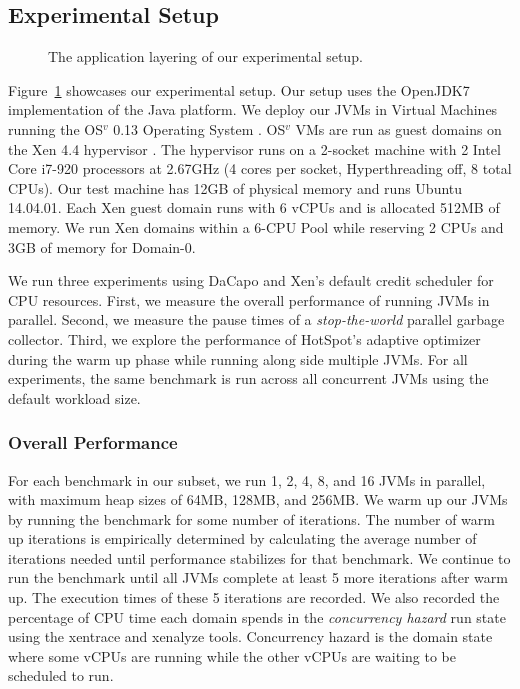 \documentclass{sig-alternate}
\begin{document}
\subsection{Experimental Setup}\label{subsec:expsetup}
\begin{figure}
\centering
{}
\caption{The application layering of our experimental setup.}
\label{fig:dacaposetup}
\end{figure}

Figure~\ref{fig:dacaposetup} showcases our experimental setup. Our setup uses the OpenJDK7 implementation of the Java platform. We deploy our JVMs in Virtual Machines running the OS$^{v}$ 0.13 Operating System \cite{aviOSv2014}. OS$^{v}$ VMs are run as guest domains on the Xen 4.4 hypervisor \cite{barham2003xen}. The hypervisor runs on a 2-socket machine with 2 Intel Core i7-920 processors at 2.67GHz (4 cores per socket, Hyperthreading off,  8 total CPUs).  Our test machine has 12GB of physical memory and runs Ubuntu 14.04.01. Each Xen guest domain runs with 6 vCPUs and is allocated 512MB of memory. We run Xen domains within a 6-CPU Pool while reserving 2 CPUs and 3GB of memory for Domain-0.  

We run three experiments using DaCapo and Xen's default credit scheduler for CPU resources. First, we measure the overall performance of running JVMs in parallel. Second, we measure the pause times of a \textit{stop-the-world} parallel garbage collector. Third, we explore the performance of HotSpot's adaptive optimizer during the warm up phase while running along side multiple JVMs. For all experiments, the same benchmark is run across all concurrent JVMs using the default workload size.

\subsubsection{Overall Performance} \label{sssec:overallperf}
For each benchmark in our subset, we run 1, 2, 4, 8, and 16 JVMs in parallel, with maximum heap sizes of 64MB, 128MB, and 256MB. We warm up our JVMs by running the benchmark for some number of iterations. The number of warm up iterations is empirically determined by calculating the average number of iterations needed until performance stabilizes for that benchmark. We continue to run the benchmark until all JVMs complete at least 5 more iterations after warm up.  The execution times of these 5 iterations are recorded. We also recorded the percentage of CPU time each domain spends in the \textit{concurrency hazard} run state using the xentrace and xenalyze tools. Concurrency hazard is the domain state where some vCPUs are running while the other vCPUs are waiting to be scheduled to run. 
\end{document}
